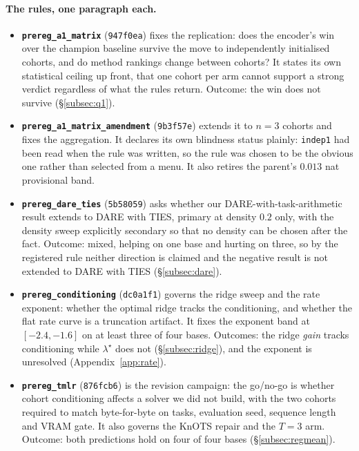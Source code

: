 \paragraph{The rules, one paragraph each.}
\begin{itemize}\itemsep2pt
\item \textbf{\texttt{prereg\_a1\_matrix}} (\texttt{947f0ea}) fixes the
replication: does the encoder's win over the champion baseline survive the
move to independently initialised cohorts, and do method rankings change
between cohorts? It states its own statistical ceiling up front, that one
cohort per arm cannot support a strong verdict regardless of what the rules
return. Outcome: the win does not survive (\S\ref{subsec:q1}).

\item \textbf{\texttt{prereg\_a1\_matrix\_amendment}} (\texttt{9b3f57e})
extends it to $n = 3$ cohorts and fixes the aggregation. It declares its
own blindness status plainly: \texttt{indep1} had been read when the rule
was written, so the rule was chosen to be the obvious one rather than
selected from a menu. It also retires the parent's $0.013$ nat provisional
band.

\item \textbf{\texttt{prereg\_dare\_ties}} (\texttt{5b58059}) asks whether
our DARE-with-task-arithmetic result extends to DARE with TIES, primary at
density $0.2$ only, with the density sweep explicitly secondary so that no
density can be chosen after the fact. Outcome: mixed, helping on one base
and hurting on three, so by the registered rule neither direction is claimed
and the negative result is not extended to DARE with TIES
(\S\ref{subsec:dare}).

\item \textbf{\texttt{prereg\_conditioning}} (\texttt{dc0a1f1}) governs the
ridge sweep and the rate exponent: whether the optimal ridge tracks the
conditioning, and whether the flat rate curve is a truncation artifact. It
fixes the exponent band at $[-2.4, -1.6]$ on at least three of four bases.
Outcomes: the ridge \emph{gain} tracks conditioning while $\lambda^\star$
does not (\S\ref{subsec:ridge}), and the exponent is unresolved
(Appendix~\ref{app:rate}).

\item \textbf{\texttt{prereg\_tmlr}} (\texttt{876fcb6}) is the revision
campaign: the go/no-go is whether cohort conditioning affects a solver we
did not build, with the two cohorts required to match byte-for-byte on
tasks, evaluation seed, sequence length and VRAM gate. It also governs the
KnOTS repair and the $T = 3$ arm. Outcome: both predictions hold on four of
four bases (\S\ref{subsec:regmean}).


\end{itemize}

